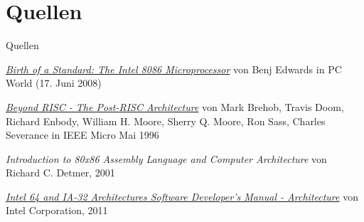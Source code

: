 \section{Quellen}

\begin{frame}{Quellen}
\begin{thebibliography}{9}

  \href{http://www.pcworld.com/article/146957/birth_of_a_standard_the_intel_8086_microprocessor.html}{
  \emph{Birth of a Standard: The Intel 8086 Microprocessor}}
	von Benj Edwards
	in PC World (17. Juni 2008)
	

	\href{http://www.cse.msu.edu/~enbody/postrisc/postrisc2.htm}{\emph{Beyond RISC - The Post-RISC Architecture}}
	von Mark Brehob, Travis Doom, Richard Enbody, William H. Moore, Sherry Q. Moore, Ron Sass, Charles Severance
	in IEEE Micro Mai 1996

	\emph{Introduction to 80x86 Assembly Language and Computer Architecture}
	von Richard C. Detmer,
	2001

	\href{http://www.intel.com/Assets/PDF/manual/253665.pdf}{
	\emph{Intel 64 and IA-32 Architectures Software Developer's Manual - Architecture}}
	von Intel Corporation,
	2011

\end{thebibliography}
\end{frame}
